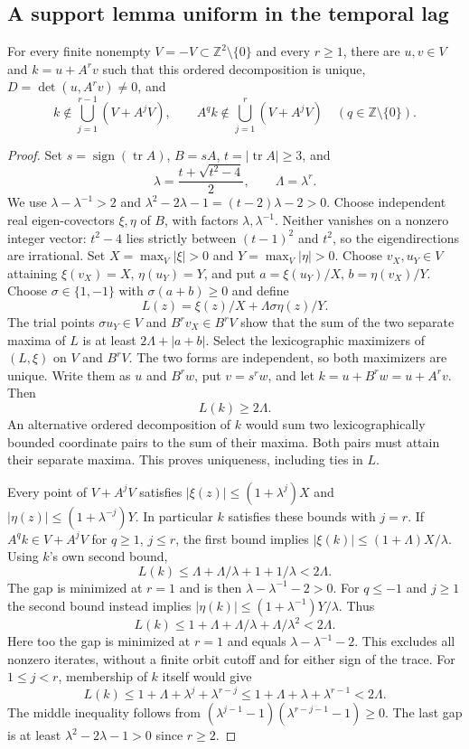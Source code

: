 \subsection{A support lemma uniform in the temporal lag}
\begin{lemma}\label{lem:temporal-support}
For every finite nonempty $V=-V\subset\mathbb Z^2\setminus\{0\}$ and every
$r\ge1$, there are $u,v\in V$ and $k=u+A^rv$ such that this ordered
decomposition is unique, $D=\det(u,A^rv)\ne0$, and
\[
 k\notin\bigcup_{j=1}^{r-1}(V+A^jV),\qquad
 A^qk\notin\bigcup_{j=1}^{r}(V+A^jV)\quad(q\in\mathbb Z\setminus\{0\}).
\]
\end{lemma}
\begin{proof}
Set $s=\operatorname{sign}(\operatorname{tr}A)$, $B=sA$,
$t=|\operatorname{tr}A|\ge3$, and
\[
 \lambda=\frac{t+\sqrt{t^2-4}}2,\qquad \Lambda=\lambda^r.
\]
We use $\lambda-\lambda^{-1}>2$ and
$\lambda^2-2\lambda-1=(t-2)\lambda-2>0$.
Choose independent real eigen-covectors $\xi,\eta$ of $B$, with factors
$\lambda,\lambda^{-1}$. Neither vanishes on a nonzero integer vector:
$t^2-4$ lies strictly between $(t-1)^2$ and $t^2$, so the eigendirections
are irrational. Set $X=\max_V|\xi|>0$ and $Y=\max_V|\eta|>0$.
Choose $v_X,u_Y\in V$ attaining $\xi(v_X)=X$, $\eta(u_Y)=Y$, and put
$a=\xi(u_Y)/X$, $b=\eta(v_X)/Y$. Choose $\sigma\in\{1,-1\}$ with
$\sigma(a+b)\ge0$ and define
\[
 L(z)=\xi(z)/X+\Lambda\sigma\eta(z)/Y.
\]
The trial points $\sigma u_Y\in V$ and $B^rv_X\in B^rV$ show that the sum
of the two separate maxima of $L$ is at least $2\Lambda+|a+b|$.
Select the lexicographic maximizers of $(L,\xi)$ on $V$ and $B^rV$.
The two forms are independent, so both maximizers are unique. Write them as
$u$ and $B^rw$, put $v=s^rw$, and let $k=u+B^rw=u+A^rv$. Then
\begin{equation}\label{eq:temporal-large-L}
 L(k)\ge2\Lambda.
\end{equation}
An alternative ordered decomposition of $k$ would sum two lexicographically
bounded coordinate pairs to the sum of their maxima. Both pairs must attain
their separate maxima. This proves uniqueness, including ties in $L$.

Every point of $V+A^jV$ satisfies
$|\xi(z)|\le(1+\lambda^j)X$ and
$|\eta(z)|\le(1+\lambda^{-j})Y$. In particular $k$ satisfies these bounds
with $j=r$. If $A^qk\in V+A^jV$ for $q\ge1$, $j\le r$, the first bound
implies $|\xi(k)|\le(1+\Lambda)X/\lambda$. Using $k$'s own second bound,
\[
 L(k)\le\Lambda+\Lambda/\lambda+1+1/\lambda<2\Lambda.
\]
The gap is minimized at $r=1$ and is then $\lambda-\lambda^{-1}-2>0$.
For $q\le-1$ and $j\ge1$ the second bound instead implies
$|\eta(k)|\le(1+\lambda^{-1})Y/\lambda$. Thus
\[
 L(k)\le1+\Lambda+\Lambda/\lambda+\Lambda/\lambda^2<2\Lambda.
\]
Here too the gap is minimized at $r=1$ and equals
$\lambda-\lambda^{-1}-2$. This excludes all nonzero iterates, without a
finite orbit cutoff and for either sign of the trace.
For $1\le j<r$, membership of $k$ itself would give
\[
 L(k)\le1+\Lambda+\lambda^j+\lambda^{r-j}
       \le1+\Lambda+\lambda+\lambda^{r-1}<2\Lambda.
\]
The middle inequality follows from
$(\lambda^{j-1}-1)(\lambda^{r-j-1}-1)\ge0$.
The last gap is at least $\lambda^2-2\lambda-1>0$ since $r\ge2$.


\end{proof}
